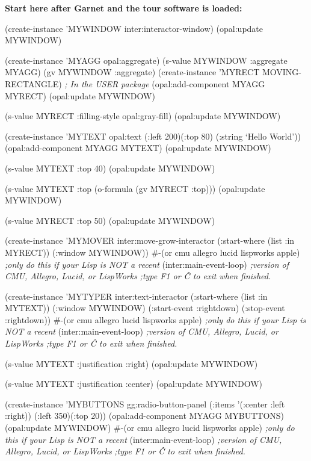 {\bf Start here after Garnet and the tour software is loaded:}
\begin{programexample}
(create-instance 'MYWINDOW inter:interactor-window)
(opal:update MYWINDOW)

(create-instance 'MYAGG opal:aggregate)
(s-value MYWINDOW :aggregate MYAGG)
(gv MYWINDOW :aggregate)
(create-instance 'MYRECT MOVING-RECTANGLE) {\it ; In the USER package}
(opal:add-component MYAGG MYRECT)
(opal:update MYWINDOW)

(s-value MYRECT :filling-style opal:gray-fill)
(opal:update MYWINDOW)

(create-instance 'MYTEXT opal:text (:left 200)(:top 80)
	(:string `Hello World'))
(opal:add-component MYAGG MYTEXT)
(opal:update MYWINDOW)

(s-value MYTEXT :top 40)
(opal:update MYWINDOW)

(s-value MYTEXT :top (o-formula (gv MYRECT :top)))
(opal:update MYWINDOW)

(s-value MYRECT :top 50)
(opal:update MYWINDOW)

(create-instance 'MYMOVER inter:move-grow-interactor
  (:start-where (list :in MYRECT))
  (:window MYWINDOW))
\#-(or cmu allegro lucid lispworks apple)  {\it ;only do this if your Lisp is NOT a recent}
(inter:main-event-loop)                   {\it ;version of CMU, Allegro, Lucid, or LispWorks}
                                          {\it ;type F1 or \^C to exit when finished.}

(create-instance 'MYTYPER inter:text-interactor
  (:start-where (list :in MYTEXT))
  (:window MYWINDOW)
  (:start-event :rightdown)
  (:stop-event :rightdown))
\#-(or cmu allegro lucid lispworks apple)  {\it ;only do this if your Lisp is NOT a recent}
(inter:main-event-loop)                   {\it ;version of CMU, Allegro, Lucid, or LispWorks}
                                          {\it ;type F1 or \^C to exit when finished.}

(s-value MYTEXT :justification :right)
(opal:update MYWINDOW)

(s-value MYTEXT :justification :center)
(opal:update MYWINDOW)

(create-instance 'MYBUTTONS gg:radio-button-panel
  (:items '(:center :left :right))
  (:left 350)(:top 20))
(opal:add-component MYAGG MYBUTTONS)
(opal:update MYWINDOW)
\#-(or cmu allegro lucid lispworks apple)  {\it ;only do this if your Lisp is NOT a recent}
(inter:main-event-loop)                   {\it ;version of CMU, Allegro, Lucid, or LispWorks}
                                          {\it ;type F1 or \^C to exit when finished.}


\end{programexample}
